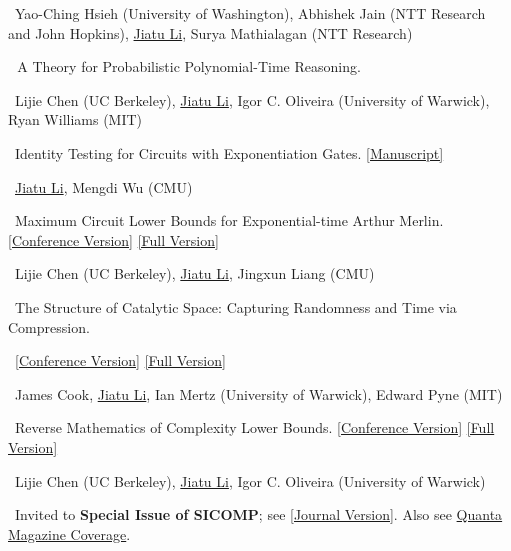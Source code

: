 \documentclass[a4paper, 11pt]{article}
\begin{document}
    \ Yao-Ching Hsieh (University of Washington), Abhishek Jain (NTT Research and John Hopkins), \underline{Jiatu Li}, Surya Mathialagan (NTT Research)

    \vspace{\pubskip}

     \tagpf\,\tagcc\ A Theory for Probabilistic Polynomial-Time Reasoning. 

    \ Lijie Chen (UC Berkeley), \underline{Jiatu Li}, Igor C. Oliveira (University of Warwick), Ryan Williams (MIT)

    \vspace{\pubskip}

     \tagcc\ Identity Testing for Circuits with Exponentiation Gates. \href{https://arxiv.org/abs/2506.04529}{[Manuscript]}
    
    \ \underline{Jiatu Li}, Mengdi Wu (CMU) 

    \vspace{\pubskip}

     \tagcc\ Maximum Circuit Lower Bounds for Exponential-time Arthur Merlin. \href{https://dl.acm.org/doi/10.1145/3717823.3718224}{[Conference Version]} \href{https://eccc.weizmann.ac.il/report/2024/182/}{[Full Version]}

    \ Lijie Chen (UC Berkeley), \underline{Jiatu Li}, Jingxun Liang (CMU)

    \vspace{\pubskip}

     \tagcc\ The Structure of Catalytic Space: Capturing Randomness and Time via Compression.
    
    \ \href{https://dl.acm.org/doi/10.1145/3717823.3718112}{[Conference Version]} \href{https://eccc.weizmann.ac.il/report/2024/106/}{[Full Version]}

    \ James Cook, \underline{Jiatu Li}, Ian Mertz (University of Warwick), Edward Pyne (MIT)

    \vspace{\pubskip}

     \tagpf\ Reverse Mathematics of Complexity Lower Bounds. \href{https://ieeexplore.ieee.org/document/10756049}{[Conference Version]} \href{https://eccc.weizmann.ac.il/report/2024/060/}{[Full Version]}
    
    \ Lijie Chen (UC Berkeley), \underline{Jiatu Li}, Igor C. Oliveira (University of Warwick)

    \ Invited to \textbf{Special Issue of SICOMP}; see \href{https://epubs.siam.org/doi/abs/10.1137/24M1717865?journalCode=smjcat}{[Journal Version]}. Also see \href{https://www.quantamagazine.org/reverse-mathematics-illuminates-why-hard-problems-are-hard-20251201/}{Quanta Magazine Coverage}.
    \vspace{\pubskip}
\end{document}
